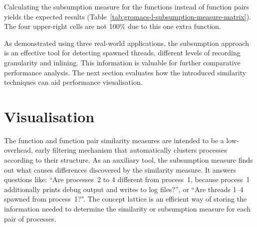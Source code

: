 \documentclass[a4paper, final, diplominf]{zih-template}
\begin{document}
Calculating the subsumption measure for the functions instead of function pairs yields the expected results (Table~\ref{tab:gromacs-l-subsumption-measure-matrix}).
The four upper-right cells are not 100\% due to this one extra function.

As demonstrated using three real-world applications, the subsumption approach is an effective tool for detecting spawned threads, different levels of recording granularity and inlining.
This information is valuable for further comparative performance analysis.
The next section evaluates how the introduced similarity techniques can aid performance visualisation.

\section{Visualisation}
\label{sec:evaluation-visualisation}
The function and function pair similarity measures are intended to be a low-overhead, early filtering mechanism that automatically clusters processes according to their structure.
As an auxiliary tool, the subsumption measure finds out what causes differences discovered by the similarity measure.
It answers questions like: ``Are processes~2 to 4 different from process~1, because process~1 additionally prints debug output and writes to log files?'', or ``Are threads 1--4 spawned from process~1?''.
The concept lattice is an efficient way of storing the information needed to determine the similarity or subsumption measure for each pair of processes.
\end{document}
